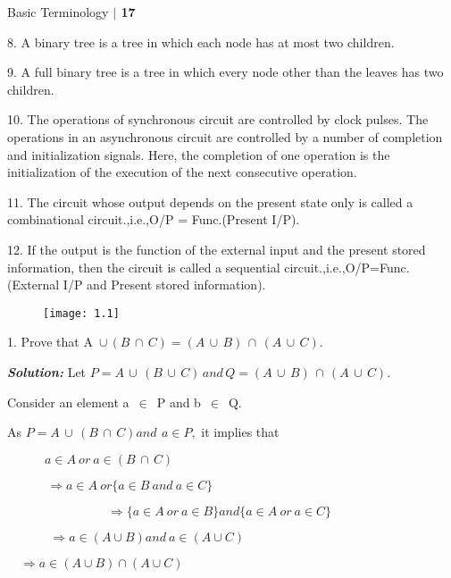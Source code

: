 \documentclass[10pt,a4paper]{article}
\begin{document}
\scriptsize

\begin{flushright}
\textsf{Basic Terminology}  \textbf{$|$ 17}
\end{flushright}


\begin{flushleft}
8. A binary tree is a tree in which each node has at most two children.

9. A full binary tree is a tree in which every node other than the leaves has two children.

10. The operations of synchronous circuit are controlled by clock pulses. The operations in an asynchronous circuit are controlled by a number of completion and initialization signals. Here, the
completion of one operation is the initialization of the execution of the next consecutive operation.

11. The circuit whose output depends on the present state only is called a combinational circuit.,i.e.,O/P = Func.(Present I/P).

12. If the output is the function of the external input and the present stored information, then the circuit
is called a sequential circuit.,i.e.,O/P=Func.(External I/P and Present stored information).
\end{flushleft}

\begin{figure}[h]
  \centering
  \texttt{[image: 1.1]}\\
\end{figure}

\begin{flushleft}
  1. Prove that A\, $\cup \,( B \,\cap \,C ) = ( A \,\cup \,B ) \,\cap\, ( A \,\cup \,C )$.
\end{flushleft}

\textbf{\textsl{Solution:}} Let $P = A \,\cup\, (B \,\cup\, C)  \,and \, Q = (A \,\cup\, B) \,\cap\, (A \,\cup\, C).$

\qquad Consider an element a\, $\in$ \,P and b\, $\in$ \,Q.

\qquad As $P = A \,\cup\, (B \,\cap\, C) and \, \:a \in P,$ it implies that
\begin{center}
$\quad \qquad a \in A\: or \:a \in (B \,\cap\, C)$

$\quad \,\qquad\Longrightarrow a \in A \:or \{a \in B \:and \:a \in C\}$

$\qquad \qquad\qquad\qquad\Longrightarrow \{a \in A \:or\: a \in B\} and \{a \in A \:or\: a \in C\}$

$\quad\quad\quad\:\,\Longrightarrow a \in (A \cup B) and \:a \in (A \cup C)$

$\quad\Longrightarrow a \in (A \cup B) \cap (A \cup C)$
\end{center}
\end{document}
